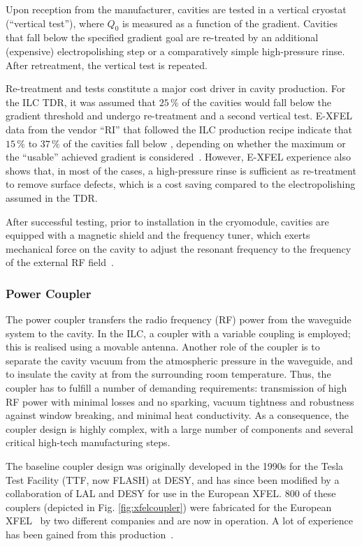 Upon reception from the manufacturer, cavities are tested in a vertical cryostat (``vertical test''), where $Q_0$ is measured as a function of the gradient.
Cavities that fall below the specified gradient goal are re-treated by an additional (expensive) electropolishing step or a comparatively simple high-pressure rinse. 
After retreatment, the vertical test is repeated.

Re-treatment and tests constitute a major cost driver in cavity production. 
For the ILC TDR, it was assumed that $25\,\%$ of the cavities would fall below the  gradient threshold and undergo re-treatment and a second vertical test.
E-XFEL data from the vendor ``RI'' that followed the ILC production recipe indicate that $15\,\%$ to $37\,\%$ of the cavities fall below , depending  on whether the maximum or the ``usable'' achieved gradient is considered~\cite{bib:Walker:2017.lcws}.
However, E-XFEL experience also shows that, in most of the cases, a high-pressure rinse is sufficient as re-treatment to remove surface defects, which is a cost saving compared to the electropolishing assumed in the TDR.

After successful testing, prior to installation in the cryomodule, cavities are equipped with a magnetic shield and the frequency tuner, which exerts mechanical force on the cavity to adjust the resonant frequency to the frequency of the external RF field~\cite[Sect. 3.3]{Adolphsen:2013kya}.  


\subsubsection{Power Coupler}

The power coupler transfers the radio frequency (RF) power from the waveguide system to the cavity. 
In the ILC, a coupler with a variable coupling is employed; this is realised using  a movable antenna.  Another role of the coupler is to 
separate the cavity vacuum from the atmospheric pressure in the waveguide, and to  insulate the cavity at  from the surrounding room temperature.
Thus,  the coupler has to fulfill a number of demanding requirements: transmission of high RF power with minimal losses and no sparking, vacuum tightness and robustness against window breaking, and minimal heat conductivity.  
As a consequence, the coupler design is highly complex, with a large number of components and several critical high-tech manufacturing steps.

The baseline coupler design was originally developed in the 1990s for the Tesla Test Facility (TTF, now FLASH) at DESY,
and has since been modified by a collaboration of LAL and DESY for use in the European XFEL.
$800$ of these couplers (depicted in Fig. \ref{fig:xfelcoupler}) were fabricated for the European XFEL~\cite{Kaabi:2013wna} by two different companies and are now in operation.
A lot of experience has been gained from this production~\cite{Sierra:2017wyc}.



